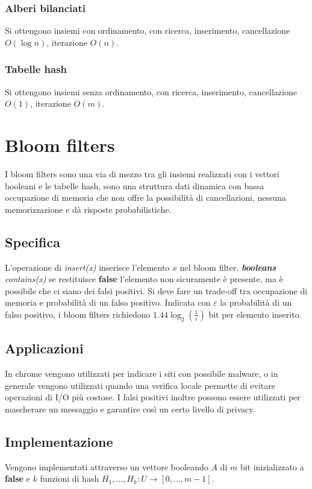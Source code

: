 \subsubsection{Alberi bilanciati}
Si ottengono insiemi con ordinamento, con ricerca, inserimento, cancellazione $O(\log n)$, iterazione $O(n)$.
\subsubsection{Tabelle hash}
Si ottengono insiemi senza ordinamento, con ricerca, inserimento, cancellazione $O(1)$, iterazione $O(m)$.
\section{Bloom filters}
I bloom filters sono una via di mezzo tra gli insiemi realizzati con i vettori booleani e le tabelle hash, sono una struttura dati dinamica con bassa
occupazione di memoria che non offre la possibilit\`a di cancellazioni, nessuna memorizzazione e d\`a risposte probabilistiche.
\subsection{Specifica}
L'operazione di \emph{insert(x)} inserisce l'elemento $x$ nel bloom filter. \emph{\textbf{booleans} contains(x)} se restituisce \textbf{false} l'elemento
non sicuramente \`e presente, ma \`e possibile che ci siano dei falsi positivi. Si deve fare un trade-off tra occupazione di memoria e probabilit\`a di un
falso positivo. Indicata con $\varepsilon$ la probabilit\`a di un falso positivo, i bloom filters richiedono $1.44\log_2(\frac{1}{\varepsilon})$ bit per
elemento inserito.
\subsection{Applicazioni}
In chrome vengono utilizzati per indicare i siti con possibile malware, o in generale vengono utilizzati quando una verifica locale permette di evitare
operazioni di I/O pi\`u costose. I falsi positivi inoltre possono essere utilizzati per mascherare un messaggio e garantire cos\`i un certo livello di
privacy.
\newpage
\subsection{Implementazione}
Vengono implementati attraverso un vettore booleando $A$ di $m$ bit inizializzato a \textbf{false} e $k$ funzioni di hash $H_1,\dots, H_k:U\rightarrow [0,
        \dots, m-1]$.
\begin{multicols}{2}
    
    \columnbreak
    
\end{multicols}
